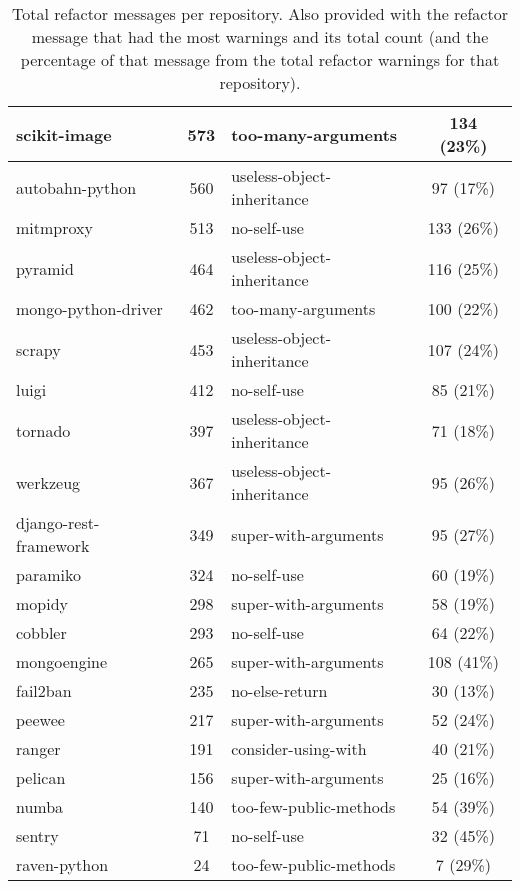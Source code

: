 \begin{table}[ht]
\begin{tabularx}{0.8\textwidth} {
    | l 
    | c
    | >{\centering\arraybackslash}X 
    | c |
  }
    scikit-image & 573 & too-many-arguments & 134 (23\%) \\ \hline
    autobahn-python & 560 & useless-object-inheritance & 97 (17\%) \\ \hline
    mitmproxy & 513 & no-self-use & 133 (26\%) \\ \hline
    pyramid & 464 & useless-object-inheritance & 116 (25\%) \\ \hline
    mongo-python-driver & 462 & too-many-arguments & 100 (22\%) \\ \hline
    scrapy & 453 & useless-object-inheritance & 107 (24\%) \\ \hline
    luigi & 412 & no-self-use & 85 (21\%) \\ \hline
    tornado & 397 & useless-object-inheritance & 71 (18\%) \\ \hline
    werkzeug & 367 & useless-object-inheritance & 95 (26\%) \\ \hline
    django-rest-framework & 349 & super-with-arguments & 95 (27\%) \\ \hline
    paramiko & 324 & no-self-use & 60 (19\%) \\ \hline
    mopidy & 298 & super-with-arguments & 58 (19\%) \\ \hline
    cobbler & 293 & no-self-use & 64 (22\%) \\ \hline
    mongoengine & 265 & super-with-arguments & 108 (41\%) \\ \hline
    fail2ban & 235 & no-else-return & 30 (13\%) \\ \hline
    peewee & 217 & super-with-arguments & 52 (24\%) \\ \hline
    ranger & 191 & consider-using-with & 40 (21\%) \\ \hline
    pelican & 156 & super-with-arguments & 25 (16\%) \\ \hline
    numba & 140 & too-few-public-methods & 54 (39\%) \\ \hline
    sentry & 71 & no-self-use & 32 (45\%) \\ \hline
    raven-python & 24 & too-few-public-methods & 7 (29\%) \\ \hline

  \end{tabularx}
  \caption{Total refactor messages per repository. Also provided with the refactor message that had the most warnings and its total count (and the percentage of that message from the total refactor warnings for that repository).}
  \label{table:refactorWarningTotals}
\end{table}

